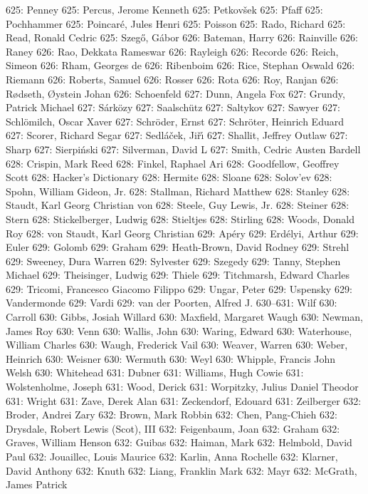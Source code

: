 625: Penney
625: Percus, Jerome Kenneth
625: Petkov\v{s}ek
625: Pfaff
625: Pochhammer
625: Poincar\'e, Jules Henri
625: Poisson
625: Rado, Richard
625: Read, Ronald Cedric
625: Szeg\H{o}, G\'abor
626: Bateman, Harry
626: Rainville
626: Raney
626: Rao, Dekkata Rameswar
626: Rayleigh
626: Recorde
626: Reich, Simeon
626: Rham, Georges de
626: Ribenboim
626: Rice, Stephan Oswald
626: Riemann
626: Roberts, Samuel
626: Rosser
626: Rota
626: Roy, Ranjan
626: R{\o}dseth, {\O}ystein Johan
626: Schoenfeld
627: Dunn, Angela Fox
627: Grundy, Patrick Michael
627: S\'ark\"ozy
627: Saalsch\"utz
627: Saltykov
627: Sawyer
627: Schl\"omilch, Oscar Xaver
627: Schr\"oder, Ernst
627: Schr\"oter, Heinrich Eduard
627: Scorer, Richard Segar
627: Sedl\'a\v cek, Ji\v r{\'\i}
627: Shallit, Jeffrey Outlaw
627: Sharp
627: Sierpi\'nski
627: Silverman, David L
627: Smith, Cedric Austen Bardell
628: Crispin, Mark Reed
628: Finkel, Raphael Ari
628: Goodfellow, Geoffrey Scott
628: Hacker's Dictionary
628: Hermite
628: Sloane
628: Solov'ev
628: Spohn, William Gideon, Jr.
628: Stallman, Richard Matthew
628: Stanley
628: Staudt, Karl Georg Christian von
628: Steele, Guy Lewis, Jr.
628: Steiner
628: Stern
628: Stickelberger, Ludwig
628: Stieltjes
628: Stirling
628: Woods, Donald Roy
628: von Staudt, Karl Georg Christian
629: Ap\'ery
629: Erd\'elyi, Arthur
629: Euler
629: Golomb
629: Graham
629: Heath-Brown, David Rodney
629: Strehl
629: Sweeney, Dura Warren
629: Sylvester
629: Szegedy
629: Tanny, Stephen Michael
629: Theisinger, Ludwig
629: Thiele
629: Titchmarsh, Edward Charles
629: Tricomi, Francesco Giacomo Filippo
629: Ungar, Peter
629: Uspensky
629: Vandermonde
629: Vardi
629: van der Poorten, Alfred J.
630--631: Wilf
630: Carroll
630: Gibbs, Josiah Willard
630: Maxfield, Margaret Waugh
630: Newman, James Roy
630: Venn
630: Wallis, John
630: Waring, Edward
630: Waterhouse, William Charles
630: Waugh, Frederick Vail
630: Weaver, Warren
630: Weber, Heinrich
630: Weisner
630: Wermuth
630: Weyl
630: Whipple, Francis John Welsh
630: Whitehead
631: Dubner
631: Williams, Hugh Cowie
631: Wolstenholme, Joseph
631: Wood, Derick
631: Worpitzky, Julius Daniel Theodor
631: Wright
631: Zave, Derek Alan
631: Zeckendorf, Edouard
631: Zeilberger
632: Broder, Andrei Zary
632: Brown, Mark Robbin
632: Chen, Pang-Chieh
632: Drysdale, Robert Lewis (Scot), III
632: Feigenbaum, Joan
632: Graham
632: Graves, William Henson
632: Guibas
632: Haiman, Mark
632: Helmbold, David Paul
632: Jouaillec, Louis Maurice
632: Karlin, Anna Rochelle
632: Klarner, David Anthony
632: Knuth
632: Liang, Franklin Mark
632: Mayr
632: McGrath, James Patrick
